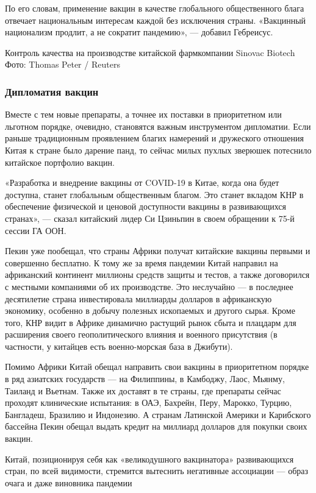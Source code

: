 По его словам, применение вакцин в качестве глобального общественного блага
отвечает национальным интересам каждой без исключения страны. «Вакцинный
национализм продлит, а не сократит пандемию», — добавил Гебреисус.

Контроль качества на производстве китайской фармкомпании Sinovac Biotech Фото:
Thomas Peter / Reuters

\subsubsection{Дипломатия вакцин}

Вместе с тем новые препараты, а точнее их поставки в приоритетном или льготном
порядке, очевидно, становятся важным инструментом дипломатии. Если раньше
традиционным проявлением благих намерений и дружеского отношения Китая к стране
было дарение панд, то сейчас милых пухлых зверюшек потеснило китайское
портфолио вакцин.

«Разработка и внедрение вакцины от COVID-19 в Китае, когда она будет доступна,
станет глобальным общественным благом. Это станет вкладом КНР в обеспечение
физической и ценовой доступности вакцины в развивающихся странах», — сказал
китайский лидер Си Цзиньпин в своем обращении к 75-й сессии ГА ООН.

Пекин уже пообещал, что страны Африки получат китайские вакцины первыми и
совершенно бесплатно. К тому же за время пандемии Китай направил на африканский
континент миллионы средств защиты и тестов, а также договорился с местными
компаниями об их производстве. Это неслучайно — в последнее десятилетие страна
инвестировала миллиарды долларов в африканскую экономику, особенно в добычу
полезных ископаемых и другого сырья. Кроме того, КНР видит в Африке динамично
растущий рынок сбыта и плацдарм для расширения своего геополитического влияния
и военного присутствия (в частности, у китайцев есть военно-морская база в
Джибути).

Помимо Африки Китай обещал направить свои вакцины в приоритетном порядке в ряд
азиатских государств — на Филиппины, в Камбоджу, Лаос, Мьянму, Таиланд и
Вьетнам. Также их доставят в те страны, где препараты сейчас проходят
клинические испытания: в ОАЭ, Бахрейн, Перу, Марокко, Турцию, Бангладеш,
Бразилию и Индонезию. А странам Латинской Америки и Карибского бассейна Пекин
обещал выдать кредит на миллиард долларов для покупки своих вакцин.

Китай, позиционируя себя как «великодушного вакцинатора» развивающихся стран,
по всей видимости, стремится вытеснить негативные ассоциации — образ очага и
даже виновника пандемии

